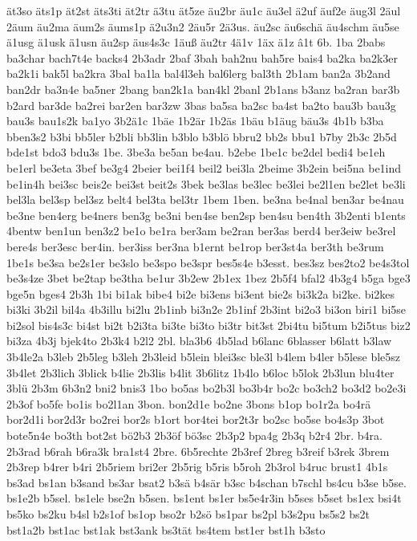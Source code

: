 {ät3so
äts1p
ät2st
äts3ti
ät2tr
ä3tu
ät5ze
äu2br
äu1c
äu3el
ä2uf
äuf2e
äug3l
2äul
2äum
äu2ma
äum2s
äums1p
ä2u3n2
2äu5r
2ä3us.
äu2sc
äu6schä
äu4schm
äu5se
ä1usg
ä1usk
ä1usn
äu2sp
äus4s3c
1äuß
äu2tr
4ä1v
1äx
ä1z
â1t
6b.
1ba
2babs
ba3char
bach7t4e
backs4
2b3adr
2baf
3bah
bah2nu
bah5re
bais4
ba2ka
ba2k3er
ba2k1i
bak5l
ba2kra
3bal
ba1la
bal4l3eh
bal6lerg
bal3th
2b1am
ban2a
3b2and
ban2dr
ba3n4e
ba5ner
2bang
ban2k1a
ban4kl
2banl
2b1ans
b3anz
ba2ran
bar3b
b2ard
bar3de
ba2rei
bar2en
bar3zw
3bas
ba5sa
ba2sc
ba4st
ba2to
bau3b
bau3g
bau3s
bau1s2k
ba1yo
3b2ä1c
1bäe
1b2är
1b2äs
1bäu
b1äug
bäu3s
4b1b
b3ba
bben3s2
b3bi
bb5ler
b2bli
bb3lin
b3blo
b3blö
bbru2
bb2s
bbu1
b7by
2b3c
2b5d
bde1st
bdo3
bdu3s
1be.
3be3a
be5an
be4au.
b2ebe
1be1c
be2del
bedi4
be1eh
be1erl
be3eta
3bef
be3g4
2beier
bei1f4
beil2
bei3la
2beime
3b2ein
bei5na
be1ind
be1in4h
bei3sc
beis2e
bei3st
beit2s
3bek
be3las
be3lec
be3lei
be2l1en
be2let
be3li
bel3la
bel3sp
bel3sz
belt4
bel3ta
bel3tr
1bem
1ben.
be3na
be4nal
ben3ar
be4nau
be3ne
ben4erg
be4ners
ben3g
be3ni
ben4se
ben2sp
ben4su
ben4th
3b2enti
b1ents
4bentw
ben1un
ben3z2
be1o
be1ra
ber3am
be2ran
ber3as
berd4
ber3eiw
be3rel
bere4s
ber3esc
ber4in.
ber3iss
ber3na
b1ernt
be1rop
ber3st4a
ber3th
be3rum
1be1s
be3sa
be2s1er
be3slo
be3spo
be3spr
bes5s4e
b3esst.
bes3sz
bes2to2
be4s3tol
be3s4ze
3bet
be2tap
be3tha
be1ur
3b2ew
2b1ex
1bez
2b5f4
bfal2
4b3g4
b5ga
bge3
bge5n
bges4
2b3h
1bi
bi1ak
bibe4
bi2e
bi3ens
bi3ent
bie2s
bi3k2a
bi2ke.
bi2kes
bi3ki
3b2il
bil4a
4b3illu
bi2lu
2b1inb
bi3n2e
2b1inf
2b3int
bi2o3
bi3on
biri1
bi5se
bi2sol
bis4s3c
bi4st
bi2t
b2i3ta
bi3te
bi3to
bi3tr
bit3st
2bi4tu
bi5tum
b2i5tus
biz2
bi3za
4b3j
bjek4to
2b3k4
b2l2
2bl.
bla3b6
4b5lad
b6lanc
6blasser
b6latt
b3law
3b4le2a
b3leb
2b5leg
b3leh
2b3leid
b5lein
blei3sc
ble3l
b4lem
b4ler
b5lese
ble5sz
3b4let
2b3lich
3blick
b4lie
2b3lis
b4lit
3b6litz
1b4lo
b6loc
b5lok
2b3lun
blu4ter
3blü
2b3m
6b3n2
bni2
bnis3
1bo
bo5as
bo2b3l
bo3b4r
bo2c
bo3ch2
bo3d2
bo2e3i
2b3of
bo5fe
bo1is
bo2l1an
3bon.
bon2d1e
bo2ne
3bons
b1op
bo1r2a
bo4rä
bor2d1i
bor2d3r
bo2rei
bor2s
b1ort
bor4tei
bor2t3r
bo2sc
bo5se
bo4s3p
3bot
bote5n4e
bo3th
bot2st
bö2b3
2b3öf
bö3sc
2b3p2
bpa4g
2b3q
b2r4
2br.
b4ra.
2b3rad
b6rah
b6ra3k
bra1st4
2bre.
6b5rechte
2b3ref
2breg
b3reif
b3rek
3brem
2b3rep
b4rer
b4ri
2b5riem
bri2er
2b5rig
b5ris
b5roh
2b3rol
b4ruc
brust1
4b1s
bs3ad
bs1an
b3sand
bs3ar
bsat2
b3sä
b4sär
b3sc
b4schan
b7schl
bs4cu
b3se
b5se.
bs1e2b
b5sel.
bs1ele
bse2n
b5sen.
bs1ent
bs1er
bs5e4r3in
b5ses
b5set
bs1ex
bsi4t
bs5ko
bs2ku
b4sl
b2s1of
bs1op
bso2r
b2sö
bs1par
bs2pl
b3s2pu
bs5s2
bs2t
bst1a2b
bst1ac
bst1ak
bst3ank
bs3tät
bs4tem
bst1er
bst1h
b3sto
}

